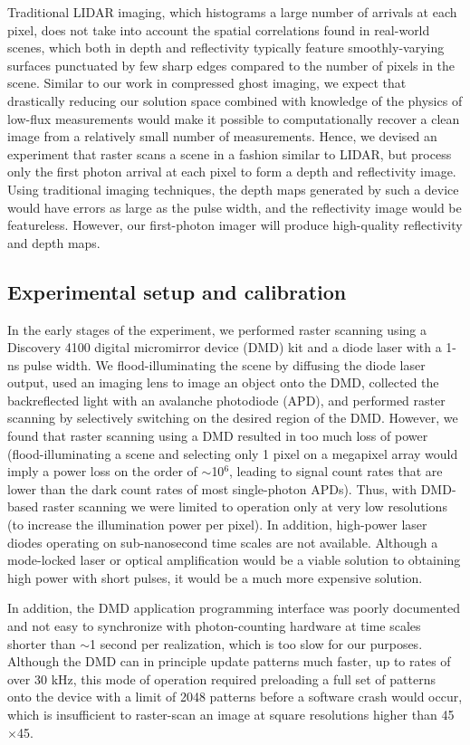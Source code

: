 Traditional LIDAR imaging, which histograms a large number of arrivals at each pixel, does not take into account the spatial correlations found in real-world scenes, which both in depth and reflectivity typically feature smoothly-varying surfaces punctuated by few sharp edges compared to the number of pixels in the scene. Similar to our work in compressed ghost imaging, we expect that drastically reducing our solution space combined with knowledge of the physics of low-flux measurements would make it possible to computationally recover a clean image from a relatively small number of measurements. Hence, we devised an experiment that raster scans a scene in a fashion similar to LIDAR, but process only the first photon arrival at each pixel to form a depth and reflectivity image. Using traditional imaging techniques, the depth maps generated by such a device would have errors as large as the pulse width, and the reflectivity image would be featureless. However, our first-photon imager will produce high-quality reflectivity and depth maps.

\subsection{Experimental setup and calibration}

In the early stages of the experiment, we performed raster scanning using a Discovery 4100 digital micromirror device (DMD) kit and a diode laser with a 1-ns pulse width. We flood-illuminating the scene by diffusing the diode laser output, used an imaging lens to image an object onto the DMD, collected the backreflected light with an avalanche photodiode (APD), and performed raster scanning by selectively switching on the desired region of the DMD. However, we found that raster scanning using a DMD resulted in too much loss of power (flood-illuminating a scene and selecting only 1 pixel on a megapixel array would imply a power loss on the order of $\sim$10$^6$, leading to signal count rates that are lower than the dark count rates of most single-photon APDs). Thus, with DMD-based raster scanning we were limited to operation only at very low resolutions (to increase the illumination power per pixel). In addition, high-power laser diodes operating on sub-nanosecond time scales are not available. Although a mode-locked laser or optical amplification would be a viable solution to obtaining high power with short pulses, it would be a much more expensive solution.

In addition, the DMD application programming interface was poorly documented and not easy to synchronize with photon-counting hardware at time scales shorter than $\sim$1 second per realization, which is too slow for our purposes. Although the DMD can in principle update patterns much faster, up to rates of over 30 kHz, this mode of operation required preloading a full set of patterns onto the device with a limit of 2048 patterns before a software crash would occur, which is insufficient to raster-scan an image at square resolutions higher than 45$\times$45.

